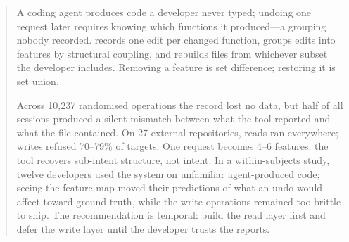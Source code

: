 \begin{abstract}
A coding agent produces code a developer never typed; undoing one request later
requires knowing which functions it produced---a grouping nobody recorded.
\sgt{} records one edit per changed function, groups edits into features by
structural coupling, and rebuilds files from whichever subset the developer
includes. Removing a feature is set difference; restoring it is set union.

Across 10{,}237 randomised operations the record lost no data, but half of all
sessions produced a silent mismatch between what the tool reported and what the
file contained. On 27 external repositories, reads ran everywhere; writes
refused 70--79\% of targets. One request becomes 4--6 features: the tool
recovers sub-intent structure, not intent. In a within-subjects study, twelve developers used the system on
unfamiliar agent-produced code; seeing the feature map moved their predictions
of what an undo would affect toward ground truth, while the write operations
remained too brittle to ship. The recommendation is temporal: build the read
layer first and defer the write layer until the developer trusts the reports.
\end{abstract}
